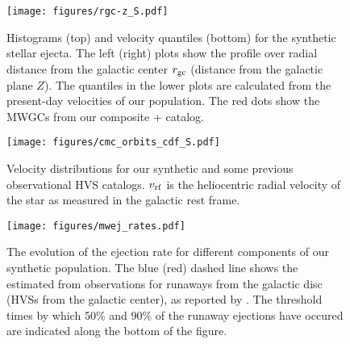 \documentclass[twocolumn]{aastex631}
\begin{document}
\begin{figure*}
    \begin{centering}
        \texttt{[image: figures/rgc-z\_S.pdf]}
        \caption{
            Histograms (top) and velocity quantiles (bottom) for the synthetic stellar ejecta.
            The left (right) plots show the profile over radial distance from the galactic center $r_{\rm gc}$ (distance from the galactic plane $Z$).
            The quantiles in the lower plots are calculated from the present-day velocities of our population.
            The red dots show the MWGCs from our composite \citet{2018MNRAS.478.1520B}+\citet{2010arXiv1012.3224H} catalog.
        }
        \label{fig:rgc-z}
    \end{centering}
\end{figure*}

\begin{figure}
    \begin{centering}
        \texttt{[image: figures/cmc\_orbits\_cdf\_S.pdf]}
        \caption{
            Velocity distributions for our synthetic and some previous observational HVS catalogs.
            $v_{\rm rf}$ is the heliocentric radial velocity of the star as measured in the galactic rest frame.
        }
        \label{fig:cmc_orbits_cdf}
    \end{centering}
\end{figure}

\begin{figure}
    \begin{centering}
        \texttt{[image: figures/mwej\_rates.pdf]}
        \caption{
            The evolution of the ejection rate for different components of our synthetic population.
            The blue (red) dashed line shows the estimated from observations for runaways from the galactic disc (HVSs from the galactic center), as reported by \citet{2015ARA&A..53...15B}.
            The threshold times by which 50\% and 90\% of the runaway ejections have occured are indicated along the bottom of the figure.
        }
        \label{fig:mwej_rates}
    \end{centering}
\end{figure}
\end{document}
